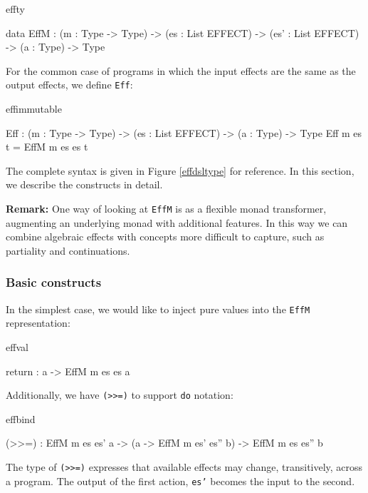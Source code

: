 \begin{SaveVerbatim}{effty}

data EffM : (m   : Type -> Type) -> 
            (es  : List EFFECT) -> 
            (es' : List EFFECT) -> (a : Type) -> Type

\end{SaveVerbatim}

\noindent
For the common case of programs in which the input effects are the same as
the output effects, we define \texttt{Eff}:

\begin{SaveVerbatim}{effimmutable}

Eff : (m : Type -> Type) -> 
      (es : List EFFECT) -> (a : Type) -> Type
Eff m es t = EffM m es es t

\end{SaveVerbatim}

\noindent
The complete syntax is given in Figure \ref{effdsltype} for reference. In this
section, we describe the constructs in detail.

\textbf{Remark: } One way of looking at \texttt{EffM} is as a flexible monad
transformer, augmenting an underlying monad with additional features. In this way
we can combine algebraic effects with concepts more difficult to capture, such
as partiality and continuations.

\subsubsection{Basic constructs}

In the simplest case, we would like to inject pure values into the
\texttt{EffM} representation:

\begin{SaveVerbatim}{effval}

return : a -> EffM m es es a

\end{SaveVerbatim}

\noindent
Additionally, we have \texttt{(>>=)} to support \texttt{do} notation:

\begin{SaveVerbatim}{effbind}

(>>=) : EffM m es es' a -> 
        (a -> EffM m es' es'' b) -> EffM m es es'' b

\end{SaveVerbatim}

\noindent
The type of \texttt{(>>=)} expresses that available effects may change,
transitively, across a program. The output of the first action, \texttt{es'}
becomes the input to the second.

